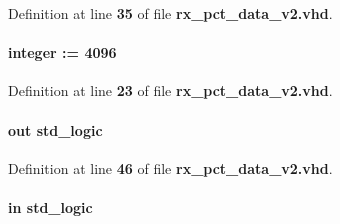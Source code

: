 Definition at line {\bf 35} of file {\bf rx\+\_\+pct\+\_\+data\+\_\+v2.\+vhd}.

\paragraph[{pct\+\_\+size}]{ {\bfseries \textcolor{vhdlchar}{ }} {\bfseries \textcolor{comment}{integer}\textcolor{vhdlchar}{ }\textcolor{vhdlchar}{ }\textcolor{vhdlchar}{\+:}\textcolor{vhdlchar}{=}\textcolor{vhdlchar}{ }\textcolor{vhdlchar}{ } \textcolor{vhdldigit}{4096} \textcolor{vhdlchar}{ }} \hspace{0.3cm}{\ttfamily [Generic]}}\label{classrx__pct__data__v2_a44633f4d858b81a59880e530dc864e81}


Definition at line {\bf 23} of file {\bf rx\+\_\+pct\+\_\+data\+\_\+v2.\+vhd}.

\paragraph[{pct\+\_\+wr\+\_\+end}]{ {\bfseries \textcolor{keywordflow}{out}\textcolor{vhdlchar}{ }} {\bfseries \textcolor{comment}{std\+\_\+logic}\textcolor{vhdlchar}{ }} \hspace{0.3cm}{\ttfamily [Port]}}\label{classrx__pct__data__v2_ad036e2e9a8d9a18943f7fc9fa60e5507}


Definition at line {\bf 46} of file {\bf rx\+\_\+pct\+\_\+data\+\_\+v2.\+vhd}.

\paragraph[{reset\+\_\+n}]{ {\bfseries \textcolor{keywordflow}{in}\textcolor{vhdlchar}{ }} {\bfseries \textcolor{comment}{std\+\_\+logic}\textcolor{vhdlchar}{ }} \hspace{0.3cm}{\ttfamily [Port]}}\label{classrx__pct__data__v2_a446ea52ed8c4a84181a47d9165ce41a5}


